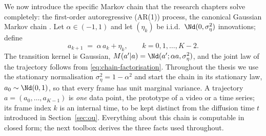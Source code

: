 We now introduce the specific Markov chain that the research chapters
solve completely: the first-order autoregressive (AR(1)) process, the
canonical Gaussian Markov chain \citep{brockwell1991time}. Let
$\alpha \in (-1, 1)$ and let $(\eta_k)$ be i.i.d.\
$\Nd(0, \sigma_\eta^2)$ innovations; define
\begin{equation}
  a_{k+1} \;=\; \alpha\, a_k + \eta_k ,
  \qquad k = 0, 1, \dots, K-2 .
  \label{eq:ar1}
\end{equation}
The transition kernel is Gaussian,
$M(a' | a) = \Nd(a'; \alpha a, \sigma_\eta^2)$, and the joint law of the
trajectory follows from \eqref{eq:chain-factorisation}. Throughout the
thesis we use the stationary normalisation
$\sigma_\eta^2 = 1 - \alpha^2$ and start the chain in its stationary law,
$a_0 \sim \Nd(0,1)$, so that every frame has unit marginal variance. A
trajectory $a = (a_0, \dots, a_{K-1})$ is \emph{one} data point, the
prototype of a video or a time series; its frame index $k$ is an internal
time, to be kept distinct from the diffusion time $t$ introduced in
Section~\ref{sec:ou}. Everything about this chain is computable in closed
form; the next toolbox derives the three facts used throughout.


